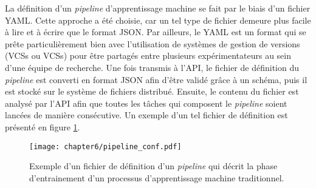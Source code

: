 La définition d'un \textit{pipeline} d'apprentissage machine se fait par le biais d'un fichier \ac{YAML}. Cette approche a été choisie, car un tel type de fichier demeure plus facile à lire et à écrire que le format \acs{JSON}. Par ailleurs, le \acs{YAML} est un format qui se prête particulièrement bien avec l'utilisation de systèmes de gestion de versions (\aclp{VCS} ou \acsp{VCS}) pour être partagés entre plusieurs expérimentateurs au sein d'une équipe de recherche. Une fois transmis à l'\acs{API}, le fichier de définition du \textit{pipeline} est converti en format JSON afin d'être validé grâce à un schéma, puis il est stocké sur le système de fichiers distribué. Ensuite, le contenu du fichier est analysé par l'\acs{API} afin que toutes les tâches qui composent le \textit{pipeline} soient lancées de manière consécutive. Un exemple d'un tel fichier de définition est présenté en figure \ref{fig:pipeline_conf}.

\begin{figure}[H]
	\centering
	\texttt{[image: chapter6/pipeline\_conf.pdf]}
        \caption{Exemple d'un fichier de définition d'un \textit{pipeline} qui décrit la phase d'entrainement d'un processus d'apprentissage machine traditionnel.}
	\label{fig:pipeline_conf}
\end{figure}

